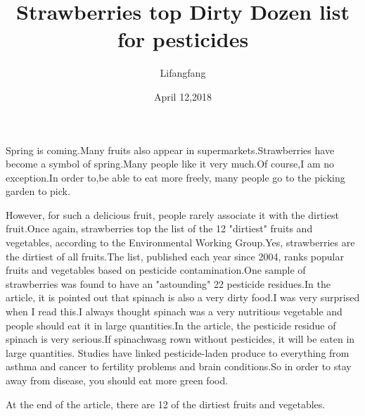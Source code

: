 \documentclass{article}
\author{Lifangfang}
\date{April 12,2018}
\title{Strawberries top Dirty Dozen list for pesticides}
\begin{document}
\maketitle

Spring is coming.Many fruits also appear in supermarkets.Strawberries have become a symbol of spring.Many people like it very much.Of course,I am no exception.In order to,be able to eat more freely, many people go to the picking garden to pick.

However, for such a delicious fruit, people rarely associate it with the dirtiest fruit.Once again, strawberries top the list of the 12 "dirtiest" fruits and vegetables, according to the Environmental Working Group.Yes, strawberries are the dirtiest of all fruits.The list, published each year since 2004, ranks popular fruits and vegetables based on pesticide contamination.One sample of strawberries was found to have an "astounding" 22 pesticide residues.In the article, it is pointed out that spinach is also a very dirty food.I was very surprised when I read this.I always thought spinach was a very nutritious vegetable and people should eat it in large quantities.In the article, the pesticide residue of spinach is very serious.If spinachwasg rown without pesticides, it will be eaten in large quantities. Studies have linked pesticide-laden produce to everything from asthma and cancer to fertility problems and brain conditions.So in order to stay away from disease, you should eat more green food.

At the end of the article, there are 12 of the dirtiest fruits and vegetables.
\end{document}
